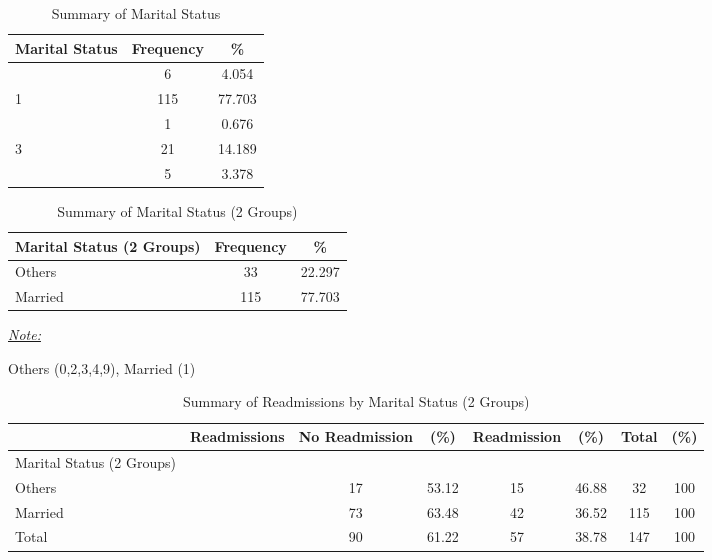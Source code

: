 \documentclass[12pt,]{article}
\begin{document}
\begin{table}[!h]

\caption{\label{tab:unnamed-chunk-7}Summary of Marital Status}
\centering
\begin{tabular}{>{\centering\arraybackslash}p{5cm}cc}
\toprule
Marital Status & Frequency & \%\\
\midrule
0 & 6 & 4.054\\
\rowcolor[HTML]{E3E5E7}  1 & 115 & 77.703\\
2 & 1 & 0.676\\
\rowcolor[HTML]{E3E5E7}  3 & 21 & 14.189\\
4 & 5 & 3.378\\
\bottomrule
\end{tabular}
\end{table}

\begin{table}[!h]

\caption{\label{tab:unnamed-chunk-7}Summary of Marital Status (2 Groups)}
\centering
\begin{threeparttable}
\begin{tabular}{>{\centering\arraybackslash}p{5cm}cc}
\toprule
Marital Status (2 Groups) & Frequency & \%\\
\midrule
Others & 33 & 22.297\\
\rowcolor[HTML]{E3E5E7}  Married & 115 & 77.703\\
\bottomrule
\end{tabular}
\begin{tablenotes}[para]
\item \underline{\textit{Note:}} 
\item Others (0,2,3,4,9), Married (1)
\end{tablenotes}
\end{threeparttable}
\end{table}

\pagebreak

\begin{table}[!h]

\caption{\label{tab:unnamed-chunk-8}Summary of Readmissions by Marital Status (2 Groups)}
\centering
\begin{tabular}{>{\centering\arraybackslash}p{5cm}ccccccc}
\toprule
  & Readmissions & No Readmission & (\%) & Readmission & (\%) & Total & (\%)\\
\midrule
Marital Status (2 Groups) &  &  &  &  &  &  & \\
\rowcolor[HTML]{E3E5E7}  Others &  & 17 & 53.12 & 15 & 46.88 & 32 & 100\\
Married &  & 73 & 63.48 & 42 & 36.52 & 115 & 100\\
\rowcolor[HTML]{E3E5E7}  Total &  & 90 & 61.22 & 57 & 38.78 & 147 & 100\\
\bottomrule
\end{tabular}
\end{table}
\end{document}
